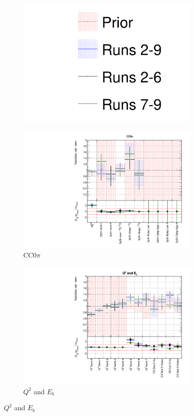 \begin{figure}
\centering
\begin{subfigure}{0.95\textwidth}
  \centering
  \includegraphics[width=0.25\linewidth]{figs/newolddatafits_leg}
\end{subfigure}
\begin{subfigure}{0.49\textwidth}
  \centering
  \includegraphics[width=0.9\linewidth]{figs/newolddatafitsxsec_1}
  \caption{CC0$\pi$}
\end{subfigure}
\begin{subfigure}{0.49\textwidth}
  \centering
  \includegraphics[width=0.9\linewidth]{figs/newolddatafitsxsec_2}
  \caption{$Q^2$ and $E_b$}
\end{subfigure}

\end{figure}

